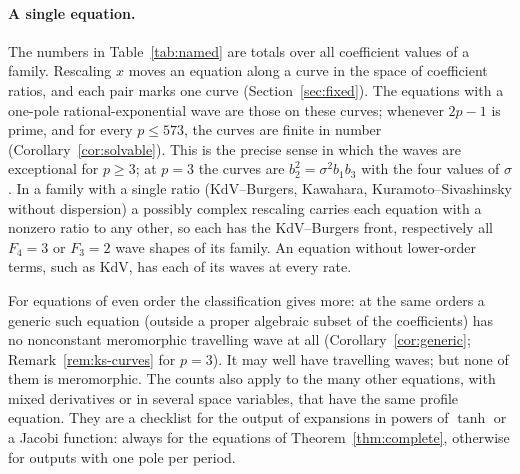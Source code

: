 \documentclass[11pt]{article}
\theoremstyle{definition}
\theoremstyle{remark}
\numberwithin{equation}{section}
\begin{document}
\paragraph{A single equation.}
The numbers in Table~\ref{tab:named} are totals over all coefficient
values of a family. Rescaling \(x\) moves an equation along a curve in
the space of coefficient ratios, and each pair marks one curve
(Section~\ref{sec:fixed}). The equations with a one-pole
rational-exponential wave are those on these curves; whenever \(2p-1\)
is prime, and for every \(p\le573\), the curves are finite in number
(Corollary~\ref{cor:solvable}). This is the precise sense in which the
waves are exceptional for \(p\ge3\); at \(p=3\) the curves are
\(b_2^2=\sigma^2b_1b_3\) with the four values of \(\sigma\). In a family
with a single ratio (KdV--Burgers, Kawahara, Kuramoto--Sivashinsky
without dispersion) a possibly complex rescaling carries each equation
with a nonzero ratio to any other, so each has the KdV--Burgers front,
respectively all \(F_4=3\) or \(F_3=2\) wave shapes of its family. An
equation without lower-order terms, such as KdV, has each of its waves
at every rate.

For equations of even order the classification gives more: at the same
orders a generic such equation (outside a proper algebraic subset of the
coefficients) has no nonconstant meromorphic travelling wave at all
(Corollary~\ref{cor:generic}; Remark~\ref{rem:ks-curves} for \(p=3\)).
It may well have travelling waves; but none of them is meromorphic. The
counts also apply to the many other equations, with mixed derivatives or
in several space variables, that have the same profile equation. They
are a checklist for the output of expansions in powers of \(\tanh\) or a
Jacobi function: always for the equations of Theorem~\ref{thm:complete},
otherwise for outputs with one pole per period.
\end{document}

